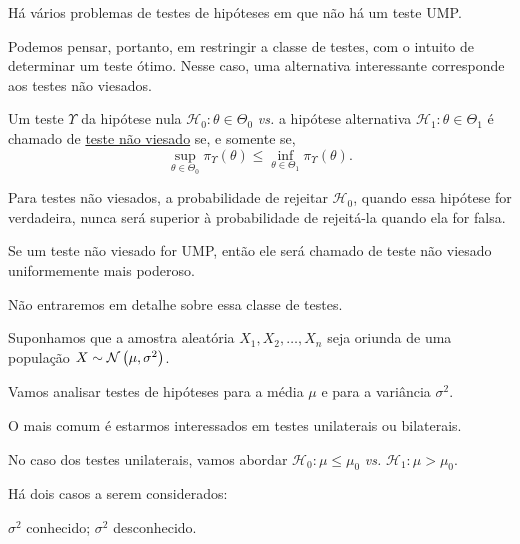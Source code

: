 Há vários problemas de testes de hipóteses em que não há um teste UMP.

Podemos pensar, portanto, em restringir a classe de testes, com o intuito de determinar um teste ótimo. Nesse caso, uma alternativa interessante corresponde aos testes não viesados.

\begin{definition}
Um teste $\Upsilon$ da hipótese nula $\mathcal{H}_0:\theta\in\Theta_0$ \emph{vs.} a hipótese alternativa $\mathcal{H}_1:\theta\in\Theta_1$ é chamado de \uline{teste não viesado} se, e somente se,
\begin{equation}
\sup_{\theta\in\Theta_0}\pi_\Upsilon(\theta)\leq\inf_{\theta\in\Theta_1}\pi_\Upsilon(\theta).
\end{equation}
\end{definition}

Para testes não viesados, a probabilidade de rejeitar $\mathcal{H}_0$, quando essa hipótese for verdadeira, nunca será superior à probabilidade de rejeitá-la quando ela for falsa.

Se um teste não viesado for UMP, então ele será chamado de teste não viesado uniformemente mais poderoso.

Não entraremos em detalhe sobre essa classe de testes.

Suponhamos que a amostra aleatória $X_1,X_2,\ldots,X_n$ seja oriunda de uma população $X\sim\normdist{\mu,\sigma^2}$.

Vamos analisar testes de hipóteses para a média $\mu$ e para a variância $\sigma^2$.

O mais comum é estarmos interessados em testes unilaterais ou bilaterais.

No caso dos testes unilaterais, vamos abordar $\mathcal{H}_0:\mu\leq\mu_0$ \emph{vs.} $\mathcal{H}_1:\mu>\mu_0$.

Há dois casos a serem considerados:
\begin{outline}
\1 $\sigma^2$ conhecido;
\1 $\sigma^2$ desconhecido.
\end{outline}

